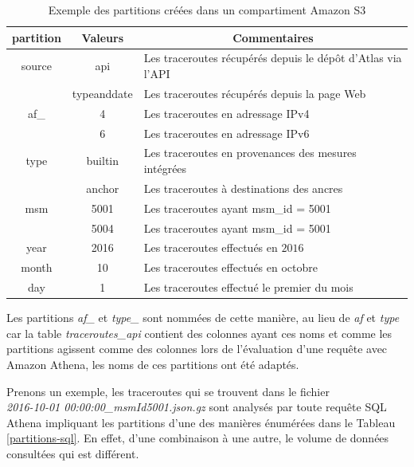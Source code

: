 \begin{table}[h]
	\centering
	\captionsetup{justification=centering}
	\begin{tabular}{|c|c|l|}
		\hline 
		\textbf{partition}	& \textbf{Valeurs} & \multicolumn{1}{c|}{\textbf{Commentaires} }\\ 
		\hline 
		source& api & Les  traceroutes récupérés depuis le dépôt  d'Atlas via l'API \\ 
		\cline{2-3}
		&typeanddate& Les  traceroutes récupérés depuis la page Web\\
		\hline 
		af\_& 4  & Les traceroutes en adressage IPv4 \\ 
		\cline{2-3} &6& Les traceroutes en adressage IPv6\\	\hline 
		type& builtin  & Les traceroutes en provenances des mesures intégrées \\ 
		\cline{2-3} 
		&anchor& Les traceroutes à destinations des ancres\\ \hline
		msm& 5001 & Les traceroutes ayant msm\_id = 5001 \\ 
		\cline{2-3}  &5004& Les traceroutes ayant msm\_id = 5001 \\
		\hline 
		year& 2016 & Les traceroutes effectués en $2016$ \\ 
		\hline 
		month& 10 & Les traceroutes effectués en octobre \\ 
		\hline 
		day& 1 & Les traceroutes effectué le premier du mois \\ 
		\hline 
	\end{tabular}
	\caption{Exemple des partitions créées dans un compartiment Amazon S3} 
	\label{tab:partition-description}
\end{table}

Les   partitions \textit{af\_} et \textit{type\_} sont nommées de cette manière, au lieu de \textit{af} et \textit{type} car  la table \textit{traceroutes\_api} contient des colonnes ayant ces noms et comme les partitions agissent comme des colonnes  lors de l'évaluation d'une requête avec Amazon Athena, les noms de ces partitions ont été adaptés.

Prenons un exemple, les traceroutes qui se trouvent dans  le fichier\\
\textit{2016-10-01 00:00:00\_msmId5001.json.gz} sont analysés par toute requête SQL Athena  
impliquant les partitions d'une des manières énumérées dans le Tableau \ref{partitions-sql}. En effet, d'une combinaison à une autre, le volume de données consultées qui est différent. 

